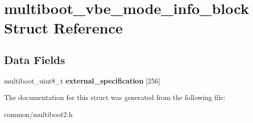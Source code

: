 \hypertarget{structmultiboot__vbe__mode__info__block}{}\section{multiboot\+\_\+vbe\+\_\+mode\+\_\+info\+\_\+block Struct Reference}
\label{structmultiboot__vbe__mode__info__block}
\subsection*{Data Fields}
\begin{DoxyCompactItemize}
\item 
multiboot\+\_\+uint8\+\_\+t {\bfseries external\+\_\+specification} \mbox{[}256\mbox{]}\hypertarget{structmultiboot__vbe__mode__info__block_a6ccb4d7d52f004c3e7e3a583dd525ebb}{}\label{structmultiboot__vbe__mode__info__block_a6ccb4d7d52f004c3e7e3a583dd525ebb}

\end{DoxyCompactItemize}


The documentation for this struct was generated from the following file\+:\begin{DoxyCompactItemize}
\item 
common/multiboot2.\+h\end{DoxyCompactItemize}
